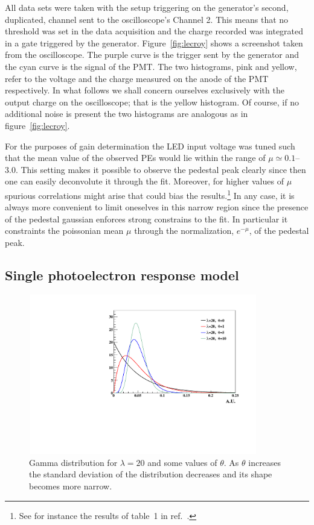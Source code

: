 \documentclass[a4paper,11pt]{article}
\begin{document}
All data sets were taken with the setup triggering on the generator's second, duplicated, channel sent to the oscilloscope's Channel 2.
This means that no threshold was set in the data acquisition and the charge recorded was integrated in a gate triggered by the generator.  
Figure~\ref{fig:lecroy} shows a screenshot taken from the oscilloscope. 
The purple curve is the trigger sent by the generator and the cyan curve is the signal of the PMT. 
The two histograms, pink and yellow, refer to the voltage and the charge %
measured on the anode of the PMT respectively. 
In what follows we shall concern ourselves exclusively with the output charge on the oscilloscope; that is the yellow histogram. 
Of course, if no additional noise is present the two histograms are analogous as in figure~\ref{fig:lecroy}. 

For the purposes of gain determination the LED input voltage was tuned such that the mean value of the observed PEs would lie within the range of $\mu \simeq 0.1$--$3.0$. 
This setting makes it possible to observe the pedestal peak clearly since then one can easily deconvolute it through the fit. 
Moreover, for higher values of $\mu$ spurious correlations might arise that could bias the results.\footnote{%
See for instance the results of table~1 in ref.~\cite{Bellamy}. }
In any case, it is always more convenient to limit oneselves in this narrow region since the presence of the pedestal gaussian enforces strong constrains to the fit.
In particular it constraints the poissonian mean $\mu$ through the normalization, $e^{-\mu}$, of the pedestal peak.
\enlargethispage{-\baselineskip}


\subsection{Single photoelectron response model}
%

\begin{figure}[!t]
\centering
\includegraphics[width=10.0cm, height=7.0cm]{figures/polya_exs.pdf} 
\caption{Gamma distribution for $\lambda=20$ and some values of $\theta$. 
As $\theta$ increases the standard deviation of the distribution decreases and its shape becomes more narrow. }
\label{fig:polya}
\end{figure}
\end{document}
